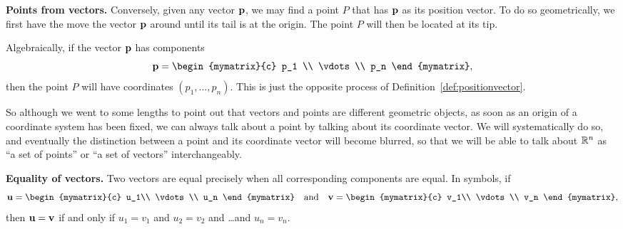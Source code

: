 \noindent\textbf{Points from vectors.} Conversely, given any vector
${\bf p}$, we may find a point $P$ that has ${\bf p}$ as its
position vector. To do so geometrically, we first have the move the
vector ${\bf p}$ around until its tail is at the origin. The point
$P$ will then be located at its tip.
\begin{center}
\end{center}
Algebraically, if the vector ${\bf p}$ has components
\begin{equation*}
  \vect{p} =
  \begin{mymatrix}{c}
    p_1    \\
    \vdots \\
    p_n
  \end{mymatrix},
\end{equation*}
then the point $P$ will have coordinates $(p_1,\ldots,p_n)$. This is
just the opposite process of Definition~\ref{def:positionvector}.

So although we went to some lengths to point out that vectors and
points are different geometric objects, as soon as an origin of a
coordinate system has been fixed, we can always talk about a point by
talking about its coordinate vector. We will systematically do so, and
eventually the distinction between a point and its coordinate vector
will become blurred, so that we will be able to talk about $\mathbb{R}^n$ as
``a set of points'' or ``a set of vectors'' interchangeably.  \bigskip

\noindent\textbf{Equality of vectors.}
Two vectors are equal precisely when all corresponding components are
equal. In symbols, if
\begin{equation*}
  \vect{u} =
  \begin{mymatrix}{c}
    u_1\\
    \vdots\\
    u_n
  \end{mymatrix}
  \quad\mbox{and}\quad
  \vect{v} =
  \begin{mymatrix}{c}
    v_1\\
    \vdots\\
    v_n
  \end{mymatrix},
\end{equation*}
then ${\bf u}={\bf v}$ if and only if $u_1=v_1$ and $u_2=v_2$ and
\ldots and $u_n=v_n$.
\bigskip

